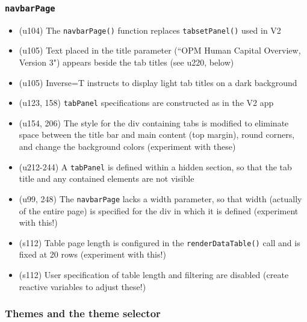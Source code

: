 \documentclass[10pt, letterpaper]{article}
\begin{document}
\begin{spacing}{1.0}
\subsubsection{\texttt{navbarPage}}

\begin{itemize}
    \item (u104) The \texttt{navbarPage()} function replaces \texttt{tabsetPanel()} used in V2
    \item (u105) Text placed in the title parameter (``OPM Human Capital Overview, Version 3") appears beside the tab titles (see u220, below) 
    \item (u105) Inverse=T instructs to display light tab titles on a dark background 
    \item (u123, 158) \texttt{tabPanel} specifications are constructed as in the V2 app
    \item (u154, 206) The style for the div containing tabs is modified to eliminate space between the title bar and main content (top margin), round corners, and change the background colors (experiment with these)
    \item (u212-244) A \texttt{tabPanel} is defined within a hidden section, so that the tab title and any contained elements are not visible
    \item (u99, 248) The \texttt{navbarPage} lacks a width parameter, so that width (actually of the entire page) is specified for the div in which it is defined (experiment with this!)
    \item (s112) Table page length is configured in the \texttt{renderDataTable()} call and is fixed at 20 rows (experiment with this!)
    \item (s112) User specification of table length and filtering are disabled (create reactive variables to adjust these!)
\end{itemize}

\subsubsection{Themes and the theme selector}


\end{spacing}
\end{document}
